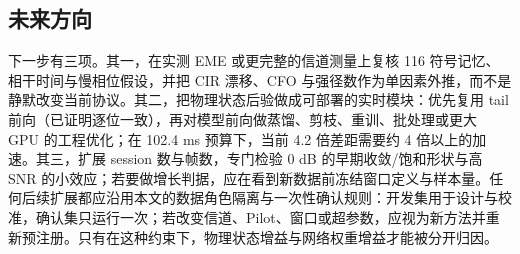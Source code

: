 \subsection{未来方向}

下一步有三项。其一，在实测 EME 或更完整的信道测量上复核 116 符号记忆、相干时间与慢相位假设，并把 CIR 漂移、CFO 与强径数作为单因素外推，而不是静默改变当前协议。其二，把物理状态后验做成可部署的实时模块：优先复用 tail 前向（已证明逐位一致），再对模型前向做蒸馏、剪枝、重训、批处理或更大 GPU 的工程优化；在 102.4 ms 预算下，当前 4.2 倍差距需要约 4 倍以上的加速。其三，扩展 session 数与帧数，专门检验 0 dB 的早期收敛/饱和形状与高 SNR 的小效应；若要做增长判据，应在看到新数据前冻结窗口定义与样本量。任何后续扩展都应沿用本文的数据角色隔离与一次性确认规则：开发集用于设计与校准，确认集只运行一次；若改变信道、Pilot、窗口或超参数，应视为新方法并重新预注册。只有在这种约束下，物理状态增益与网络权重增益才能被分开归因。
